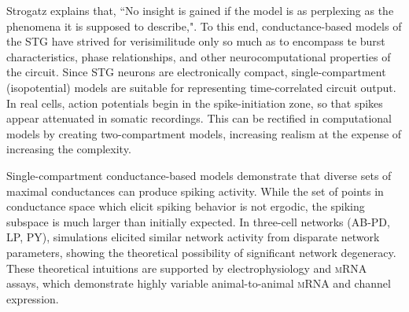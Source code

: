Strogatz explains that, ``No insight is gained if the model is as perplexing as the phenomena it is supposed to describe,"\autocite{StrogatzSyncEmergingScience2003}. To this end, conductance-based models of the \acs{STG} have strived for verisimilitude only so much as to encompass te burst characteristics, phase relationships, and other neurocomputational properties of the circuit. Since \acs{STG} neurons are electronically compact, single-compartment (isopotential) models are suitable for representing time-correlated circuit output\autocite{AbbottAnalysisNeuronModels1993,PrinzAlternativehandtuningconductancebased2003,PrinzComputationalapproachesneuronal2010}. In real cells, action potentials begin in the spike-initiation zone, so that spikes appear attenuated in somatic recordings. This can be rectified in computational models by creating two-compartment models, increasing realism at the expense of increasing the complexity\autocite{Soto-TrevinoComputationalmodelelectrically2005}.

Single-compartment conductance-based models demonstrate that diverse sets of maximal conductances can produce spiking activity. While the set of points in conductance space which elicit spiking behavior is not ergodic, the spiking subspace is much larger than initially expected\autocite{PrinzAlternativehandtuningconductancebased2003}. In three-cell networks (\acs{AB}-\acs{PD}, \acs{LP}, \acs{PY}), simulations elicited similar network activity from disparate network parameters, showing the theoretical possibility of significant network degeneracy\autocite{PrinzSimilarnetworkactivity2004}. These theoretical intuitions are supported by electrophysiology and \textsc{mRNA} assays, which demonstrate highly variable animal-to-animal \textsc{mRNA} and channel expression\autocite{SchulzVariablechannelexpression2006,GoaillardFunctionalconsequencesanimaltoanimal2009,HamoodAnimaltoanimalvariabilityneuromodulation2014}.


